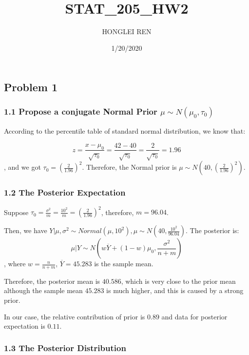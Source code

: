 \documentclass[
]{article}
\title{STAT\_205\_HW2}
\author{HONGLEI REN}
\date{1/20/2020}
\begin{document}
\maketitle

\hypertarget{problem-1}{%
\subsection{Problem 1}\label{problem-1}}

\hypertarget{propose-a-conjugate-normal-prior-mu-sim-nmu_0-tau_0}{%
\subsubsection{\texorpdfstring{1.1 Propose a conjugate Normal Prior
\(\mu \sim N(\mu_0, \tau_0)\)}{1.1 Propose a conjugate Normal Prior \textbackslash mu \textbackslash sim N(\textbackslash mu\_0, \textbackslash tau\_0)}}\label{propose-a-conjugate-normal-prior-mu-sim-nmu_0-tau_0}}

According to the percentile table of standard normal distribution, we
know that:

\[z = \frac{x - \mu_0}{\sqrt{\tau_0}} = \frac{42 - 40}{\sqrt{\tau_0}} = \frac{2}{\sqrt{\tau_0}}= 1.96\],
and we got \(\tau_0 = (\frac{2}{1.96})^2\). Therefore, the Normal prior
is \(\mu \sim N(40, (\frac{2}{1.96})^2)\).

\hypertarget{the-posterior-expectation}{%
\subsubsection{1.2 The Posterior
Expectation}\label{the-posterior-expectation}}

Suppose
\(\tau_0 = \frac{\sigma^2}{m} = \frac{10^2}{m} = (\frac{2}{1.96})^2\),
therefore, \(m = 96.04\).

Then, we have
\(Y|\mu, \sigma^2 \sim Normal(\mu, 10^2), \mu \sim N(40, \frac{10^2}{96.04})\).
The posterior
is:\[\mu|Y \sim N(w\overline{Y} + (1 - w) \mu_0, \frac{\sigma^2}{n + m})\],
where \(w = \frac{n}{n + m}\), \(\overline{Y} = 45.283\) is the sample
mean.

Therefore, the posterior mean is \(40.586\), which is very close to the
prior mean although the sample mean \(45.283\) is much higher, and this
is caused by a strong prior.

In our case, the relative contribution of prior is \(0.89\) and data for
posterior expectation is \(0.11\).

\hypertarget{the-posterior-distribution}{%
\subsubsection{1.3 The Posterior
Distribution}\label{the-posterior-distribution}}
\end{document}
